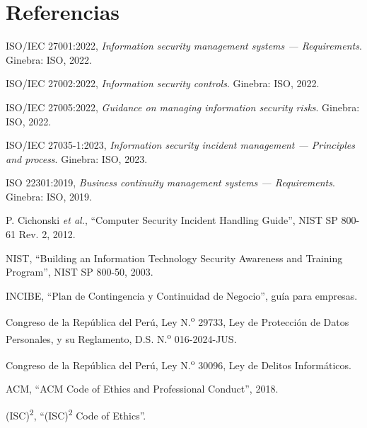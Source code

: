 \section*{Referencias}
{\small
\begin{enumerate}[label={[\arabic*]},leftmargin=2em]
  \item ISO/IEC 27001:2022, \emph{Information security management systems --- Requirements}. Ginebra: ISO, 2022.
  \item ISO/IEC 27002:2022, \emph{Information security controls}. Ginebra: ISO, 2022.
  \item ISO/IEC 27005:2022, \emph{Guidance on managing information security risks}. Ginebra: ISO, 2022.
  \item ISO/IEC 27035-1:2023, \emph{Information security incident management --- Principles and process}. Ginebra: ISO, 2023.
  \item ISO 22301:2019, \emph{Business continuity management systems --- Requirements}. Ginebra: ISO, 2019.
  \item P. Cichonski \emph{et al.}, ``Computer Security Incident Handling Guide'', NIST SP 800-61 Rev. 2, 2012.
  \item NIST, ``Building an Information Technology Security Awareness and Training Program'', NIST SP 800-50, 2003.
  \item INCIBE, ``Plan de Contingencia y Continuidad de Negocio'', guía para empresas.
  \item Congreso de la República del Perú, Ley N.\textsuperscript{o} 29733, Ley de Protección de Datos Personales, y su Reglamento, D.S. N.\textsuperscript{o} 016-2024-JUS.
  \item Congreso de la República del Perú, Ley N.\textsuperscript{o} 30096, Ley de Delitos Informáticos.
  \item ACM, ``ACM Code of Ethics and Professional Conduct'', 2018.
  \item (ISC)\textsuperscript{2}, ``(ISC)\textsuperscript{2} Code of Ethics''.
\end{enumerate}
}
